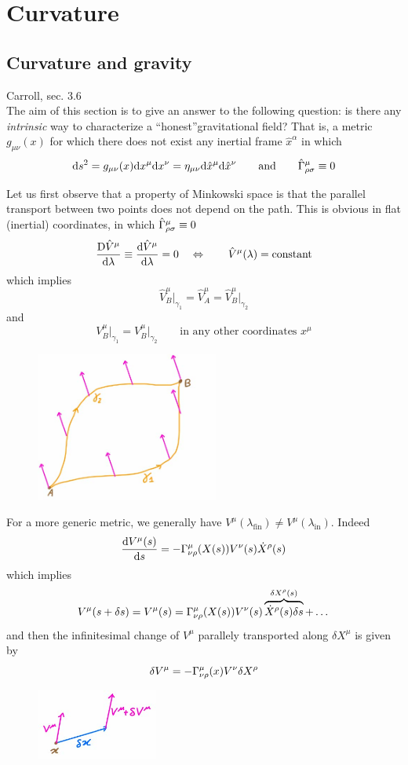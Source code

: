 \documentclass[../main/main.tex]{subfiles}
\begin{document}
\chapter{Curvature}


\section{Curvature and gravity}
\textsf{Carroll, sec. 3.6}\\

The aim of this section is to give an answer to the following question: is there any \emph{intrinsic} way to characterize a ``honest''gravitational field? That is, a metric $g_{\mu\nu}(x)$ for which there does not exist any inertial frame $\hat x^\alpha$ in which
\[\textup{d} s^2=g_{\mu\nu}(x)\textup{d} x^\mu\textup{d} x^\nu=\eta_{\mu\nu}\textup{d}\hat x^\mu\textup{d}\hat x^\nu\qquad\text{and}\qquad{\hat\Gamma}^{\mu}_{\rho \sigma}\equiv0\]

Let us first observe that a property of Minkowski space is that the parallel transport between two points does not depend on the path. This is obvious in flat (inertial) coordinates, in which ${\hat\Gamma}^{\mu}_{\rho \sigma}\equiv0$
\[\frac{\text{D}\hat V^\mu}{\textup{d}\lambda}\equiv\frac{\textup{d} \hat V^\mu}{\textup{d} \lambda}=0\quad\Leftrightarrow\qquad\hat V^\mu(\lambda)=\text{constant}\]
which implies
\[\hat V^\mu_B\vert_{\gamma_1}=\hat V_A^\mu=\hat V^\mu_B\vert_{\gamma_2}\]
and
\[V^\mu_B\vert_{\gamma_1}= V^\mu_B\vert_{\gamma_2}\qquad\text{in any other coordinates }x^\mu\]
%
\begin{figure}[H]
\centering
\includegraphics[width=6cm]{../img/curv-path-comm.jpg}
\end{figure}

For a more generic metric, we generally have $V^\mu(\lambda_{\text{fin}})\neq V^\mu(\lambda_{\text{in}})$. Indeed
\[\frac{\textup{d} V^\mu(s)}{\textup{d} s}=-{\Gamma}^{\mu}_{\nu \rho}(X(s))V^\nu(s)\dot X^\rho(s)\]
which implies
\[V^\mu(s+\delta s)=V^\mu(s)={\Gamma}^{\mu}_{\nu \rho}(X(s))V^\nu(s)\overbrace{\dot X^\rho(s)\delta s}^{\delta X^\rho(s)}+\dots\]
and then the infinitesimal change of $V^\mu$ parallely transported along $\delta X^\mu$ is given by
\[\delta V^\mu=-{\Gamma}^{\mu}_{\nu \rho}(x)V^\nu\delta X^\rho\]
%
\begin{figure}[H]
\centering
\includegraphics[width=4cm]{../img/curv-V-parall-trasp.jpg}
\end{figure}
\end{document}
